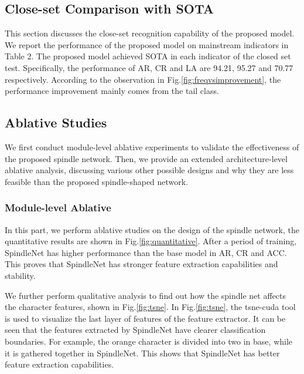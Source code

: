 \subsection{Close-set Comparison with SOTA}
This section discusses the close-set recognition capability of the proposed model. We report the performance of the proposed model on mainstream indicators in Table 2. The proposed model achieved SOTA in each indicator of the closed set test. Specifically, the performance of AR, CR and LA are 94.21, 95.27 and 70.77 respectively. According to the observation in Fig.\ref{fig:freqvsimprovement}, the performance improvement mainly comes from the tail class.



\subsection{Ablative Studies}
We first conduct module-level ablative experiments to validate the effectiveness of the proposed spindle network. Then, we provide an extended architecture-level ablative analysis, discussing various other possible designs and why they are less feasible than the proposed spindle-shaped network. 

\subsubsection{Module-level Ablative}

In this part, we perform ablative studies on the design of the spindle network, the quantitative results are shown in Fig.\ref{fig:quantitative}. After a period of training, SpindleNet has higher performance than the base model in AR, CR and ACC. This proves that SpindleNet has stronger feature extraction capabilities and stability.


We further perform qualitative analysis to find out how the spindle net affects the character features, shown in Fig.\ref{fig:tsne}. In Fig.\ref{fig:tsne}, the tsne-cuda tool is used to visualize the last layer of features of the feature extractor. It can be seen that the features extracted by SpindleNet have clearer classification boundaries. For example, the orange character is divided into two  in base, while it is gathered together in SpindleNet. This shows that SpindleNet has better feature extraction capabilities.

